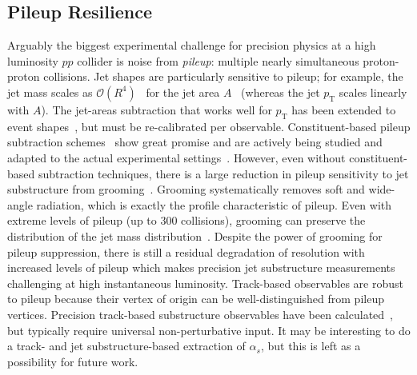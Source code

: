 %
%
%


\subsection{Pileup Resilience}

Arguably the biggest experimental challenge for precision physics at a high luminosity $pp$ collider is noise from \textit{pileup}: multiple nearly simultaneous proton-proton collisions.  Jet shapes are particularly sensitive to pileup; for example, the jet mass scales as $\mathcal{O}(R^4)$~\cite{Salam:2009jx} for the jet area $A$~\cite{Cacciari:2008gn} (whereas the jet $p_\text{T}$ scales linearly with $A$).  The jet-areas subtraction that works well for $p_\text{T}$ has been extended to event shapes~\cite{Soyez:2012hv}, but must be re-calibrated per observable.  Constituent-based pileup subtraction schemes~\cite{Cacciari:2014gra,Krohn:2013lba,Bertolini:2014bba,Berta:2014eza,Komiske:2017ubm} show great promise and are actively being studied and adapted to the actual experimental settings~\cite{CMS-PAS-JME-14-001,CMS-DP-2015-034,ATLAS-CONF-2017-065,ATL-PHYS-PUB-2017-020,Aad:2015ina}.  However, even without constituent-based subtraction techniques, there is a large reduction in pileup sensitivity to jet substructure from grooming~\cite{CMS-PAS-JME-14-001,Aad:2015rpa,Aad:2015ina,Altheimer:2013yza}.  Grooming systematically removes soft and wide-angle radiation, which is exactly the profile characteristic of pileup.   Even with extreme levels of pileup (up to 300 collisions), grooming can preserve the distribution of the jet mass distribution~\cite{JetSubstructureECFA2014}.   Despite the power of grooming for pileup suppression, there is still a residual degradation of resolution with increased levels of pileup which makes precision jet substructure measurements challenging at high instantaneous luminosity.  Track-based observables are robust to pileup because their vertex of origin can be well-distinguished from pileup vertices.  Precision track-based substructure observables have been calculated~\cite{Krohn:2012fg,Waalewijn:2012sv,Chang:2013rca,Elder:2017bkd}, but typically require universal non-perturbative input.  It may be interesting to do a track- and jet substructure-based extraction of $\alpha_s$, but this is left as a possibility for future work.
